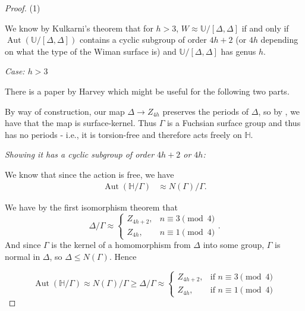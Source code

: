\documentclass[reqno]{amsart}
\theoremstyle{definition}
\theoremstyle{remark}
\DeclareMathOperator{\Aut}{Aut}
\begin{document}
\begin{proof}
    (1)

    We know by Kulkarni's theorem that for $h >3$,
    $W \approx \mathbb{U}/ \left[\Delta, \Delta \right]$ if and only if
    $\Aut (\mathbb{U}/ \left[\Delta, \Delta \right]) $ contains a cyclic subgroup of
    order $4h+2$ (or $4h$ depending on what the type of the Wiman surface is) and $\mathbb{U}/ \left[\Delta, \Delta \right]$
    has genus $h$.\\
    \linebreak

    \textit{Case: $h > 3$}

There is a paper by Harvey \cite{Harvey} which might be useful for the following two parts.\\
\linebreak

By way of construction, our map $\Delta \to
Z_{4h}$ preserves the periods of $\Delta$, so
by \cite[Theorem~3]{Harvey}, we have that the
map is surface-kernel. Thus $\Gamma$ is a Fuchsian surface group and thus has no periods - i.e., it is torsion-free and therefore acts freely on $\mathbb{H}$.\\
\linebreak




\textit{Showing it has a cyclic subgroup of order $4h+2$
or $4h$:}\\
\linebreak

We know \cite[Prop. 2.35]{Girondo-Gonzalez-Diez} that since the action is free, we have
\begin{align*}
\Aut( \mathbb{H} / \Gamma) 
&\approx
N(\Gamma)/ \Gamma.
\end{align*}

We have by the first isomorphism theorem that
\[\Delta / \Gamma \approx 
\begin{cases}
    Z_{4h+2},& n \equiv 3 \pmod{4}\\
    Z_{4h},& n \equiv 1 \pmod{4}
\end{cases}.
\]
And since $\Gamma$ is the kernel of a homomorphism from
$\Delta$ into some group, $\Gamma$ is normal in $\Delta$, so
$\Delta \leq N(\Gamma)$.
Hence

\[\Aut (\mathbb{H}/\Gamma) \approx
N(\Gamma) / \Gamma \geq \Delta / \Gamma \approx 
\begin{cases}
    Z_{4h+2},& \text{if } n \equiv 3 \pmod{4}\\
    Z_{4h},& \text{if } n \equiv 1 \pmod{4}
\end{cases}
\]




\end{proof}
\end{document}
